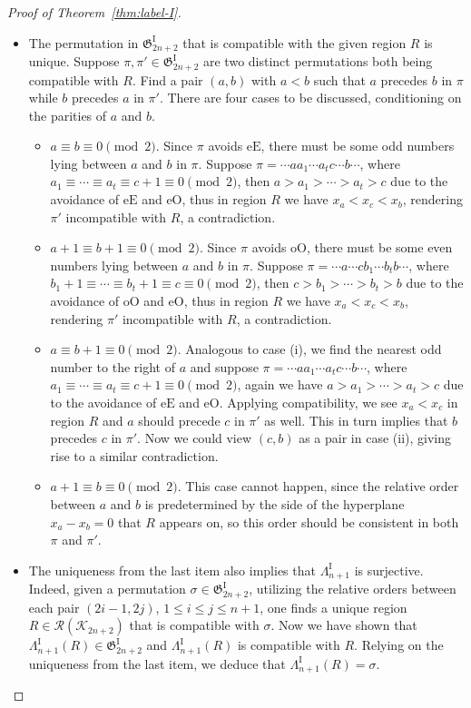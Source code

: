 \documentclass[11pt,reqno]{amsart}
\numberwithin{equation}{section}
\theoremstyle{plain}
\theoremstyle{definition}
\newcommand{\fG}{\mathfrak{G}}
\newcommand{\cK}{\mathcal{K}}
\newcommand{\cR}{\mathcal{R}}
\newcommand{\GI}{\fG^{\mathrm{I}}}
\newcommand{\LI}{\Lambda^{\mathrm{I}}}
\def\oO{\mathrm{oO}}
\def\eE{\mathrm{eE}}
\def\eO{\mathrm{eO}}
\begin{document}
\begin{proof}[Proof of Theorem~\ref{thm:label-I}]
\begin{itemize}
 		\item The permutation in $\GI_{2n+2}$ that is compatible with the given region $R$ is unique. Suppose $\pi,\pi'\in\GI_{2n+2}$ are two distinct permutations both being compatible with $R$. Find a pair $(a,b)$ with $a<b$ such that $a$ precedes $b$ in $\pi$ while $b$ precedes $a$ in $\pi'$. There are four cases to be discussed, conditioning on the parities of $a$ and $b$.
 		\begin{itemize}
 			\item[(i)] $a\equiv b\equiv 0\pmod 2$. Since $\pi$ avoids $\eE$, there must be some odd numbers lying between $a$ and $b$ in $\pi$. Suppose $\pi=\cdots aa_1\cdots a_t c\cdots b\cdots$, where $a_1\equiv\cdots\equiv a_t\equiv c+1\equiv 0\pmod 2$, then $a>a_1>\cdots>a_t>c$ due to the avoidance of $\eE$ and $\eO$, thus in region $R$ we have $x_a<x_c<x_b$, rendering $\pi'$ incompatible with $R$, a contradiction.
 			\item[(ii)] $a+1\equiv b+1\equiv 0\pmod 2$. Since $\pi$ avoids $\oO$, there must be some even numbers lying between $a$ and $b$ in $\pi$. Suppose $\pi=\cdots a\cdots c b_1\cdots b_t b\cdots$, where $b_1+1\equiv\cdots\equiv b_t+1\equiv c\equiv 0\pmod 2$, then $c>b_1>\cdots>b_t>b$ due to the avoidance of $\oO$ and $\eO$, thus in region $R$ we have $x_a<x_c<x_b$, rendering $\pi'$ incompatible with $R$, a contradiction.
 			\item[(iii)] $a\equiv b+1\equiv 0\pmod 2$. Analogous to case (i), we find the nearest odd number to the right of $a$ and suppose $\pi=\cdots aa_1\cdots a_t c\cdots b\cdots$, where $a_1\equiv\cdots\equiv a_t\equiv c+1\equiv 0\pmod 2$, again we have $a>a_1>\cdots>a_t>c$ due to the avoidance of $\eE$ and $\eO$. Applying compatibility, we see $x_a<x_c$ in region $R$ and $a$ should precede $c$ in $\pi'$ as well. This in turn implies that $b$ precedes $c$ in $\pi'$. Now we could view $(c,b)$ as a pair in case (ii), giving rise to a similar contradiction.
 			\item[(iv)] $a+1\equiv b\equiv 0\pmod 2$. This case cannot happen, since the relative order between $a$ and $b$ is predetermined by the side of the hyperplane $x_a-x_b=0$ that $R$ appears on, so this order should be consistent in both $\pi$ and $\pi'$.
 		\end{itemize}

 		\item The uniqueness from the last item also implies that $\LI_{n+1}$ is surjective. Indeed, given a permutation $\sigma\in\GI_{2n+2}$, utilizing the relative orders between each pair $(2i-1,2j)$, $1\le i\le j\le n+1$, one finds a unique region $R\in \cR(\cK_{2n+2})$ that is compatible with $\sigma$. Now we have shown that $\LI_{n+1}(R)\in\GI_{2n+2}$ and $\LI_{n+1}(R)$ is compatible with $R$. Relying on the uniqueness from the last item, we deduce that $\LI_{n+1}(R)=\sigma$.

 		
 		
 	\end{itemize}
 \end{proof}
 
\end{document}
